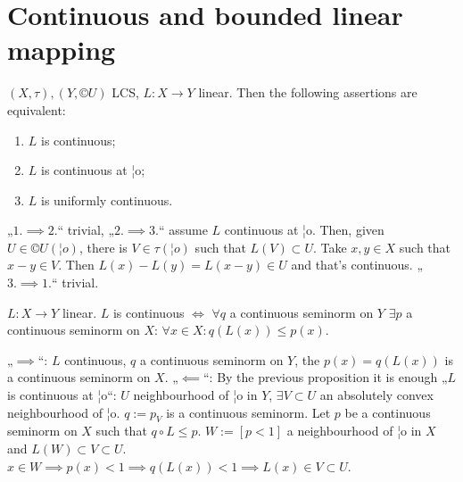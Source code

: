 \documentclass[12pt]{article}					%
\begin{document}
\section{Continuous and bounded linear mapping}
\begin{tvrzeni}
	$(X, τ), (Y, ©U)$ LCS, $L: X \rightarrow Y$ linear. Then the following assertions are equivalent:
	\begin{enumerate}
		\item $L$ is continuous;
		\item $L$ is continuous at ¦o;
		\item $L$ is uniformly continuous.
	\end{enumerate}

	\begin{dukazin}
		„$1. \implies 2.$“ trivial, „$2. \implies 3.$“ assume $L$ continuous at ¦o. Then, given $U \in ©U(¦o)$, there is $V \in τ(¦o)$ such that $L(V) \subset U$. Take $x, y \in X$ such that $x - y \in V$. Then $L(x) - L(y) = L(x - y) \in U$ and that's continuous. „$3. \implies 1.$“ trivial.
	\end{dukazin}
\end{tvrzeni}

\begin{tvrzeni}
	$L: X \rightarrow Y$ linear. $L$ is continuous $\Leftrightarrow$ $\forall q$ a continuous seminorm on $Y$ $\exists p$ a continuous seminorm on $X$: $\forall x \in X: q(L(x)) ≤ p(x)$.

	\begin{dukazin}
		„$\implies$“: $L$ continuous, $q$ a continuous seminorm on $Y$, the $p(x) = q(L(x))$ is a continuous seminorm on $X$. „$\impliedby$“: By the previous proposition it is enough „$L$ is continuous at ¦o“: $U$ neighbourhood of ¦o in $Y$, $\exists V \subset U$ an absolutely convex neighbourhood of ¦o. $q:=p_V$ is a continuous seminorm. Let $p$ be a continuous seminorm on $X$ such that $q ∘ L ≤ p$. $W := [p < 1]$ a neighbourhood of ¦o in $X$ and $L(W) \subset V \subset U$. $x \in W \implies p(x) < 1 \implies q(L(x)) < 1 \implies L(x) \in V \subset U$.
	\end{dukazin}
\end{tvrzeni}
\end{document}
